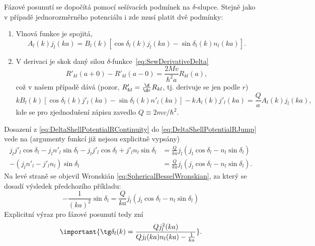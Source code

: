 \begin{solution}
		Fázové posunutí se dopočítá pomocí sešívacích podmínek na $\delta$-slupce.
		Stejně jako v případě jednorozměrného potenciálu i zde musí platit dvě podmínky:
		\begin{enumerate}
			\item
				Vlnová funkce je spojitá,
				\begin{equation}\label{eq:DeltaShellPotentialRContinuity}
					A_{l}(k)j_{l}(ka)
						=B_{l}(k)\left[\cos{\delta_{l}(k)}j_{l}(ka)-\sin{\delta_{l}(k)}n_{l}(ka)\right].
				\end{equation}
					
			\item
				V derivaci je skok daný silou $\delta$-funkce~\eqref{eq:SewDerivativeDelta}
				\begin{equation}
					R'_{kl}(a+0)-R'_{kl}(a-0)
						=\frac{2Mv}{\hbar^{2}a}R_{kl}(a),
				\end{equation}
				což v našem případě dává (pozor, $R'_{kl}=\frac{\d}{\d r}R_{kl}$, tj. derivuje se jen podle $r$)
				\begin{equation}\label{eq:DeltaShellPotentialRJump}
					kB_{l}(k)\left[\cos{\delta_{l}(k)}j'_{l}(ka)-\sin{\delta_{l}(k)}n'_{l}(ka)\right]
						-kA_{l}(k)j'_{l}(ka)
						=\frac{Q}{a}A_{l}(k)j_{l}(ka),
				\end{equation}
				kde se pro zjednodušení zápisu zavedlo $Q\equiv2mv/\hbar^{2}$.
		\end{enumerate}
		
		Dosazení z \eqref{eq:DeltaShellPotentialRContinuity} do \eqref{eq:DeltaShellPotentialRJump} vede na (argumenty funkcí již nejsou explicitně vypsány)
		\begin{align}
			j_{l}j'_{l}\cos{\delta_{l}}-j_{l}n'_{l}\sin{\delta_{l}}
				-j_{l}j'_{l}\cos{\delta_{l}}+j'_{l}n_{l}\sin{\delta_{l}}
				&=\frac{Q}{ka}j_{l}\left(j_{l}\cos{\delta_{l}}-n_{l}\sin{\delta_{l}}\right)\nonumber\\
			-\left(j_{l}n'_{l}-j'_{l}n_{l}\right)\sin{\delta_{l}}
				&=\frac{Q}{ka}j_{l}\left(j_{l}\cos{\delta_{l}}-n_{l}\sin{\delta_{l}}\right).
		\end{align}
		Na levé straně se objevil Wronskián \eqref{eq:SphericalBesselWronskian}, za který se dosadí výsledek předchozího příkladu:
		\begin{equation}
			-\frac{1}{(ka)^{2}}\sin{\delta_{l}}
				=\frac{Q}{ka}j_{l}\left(j_{l}\cos{\delta_{l}}-n_{l}\sin{\delta_{l}}\right)
		\end{equation}
		Explicitní výraz pro fázové posunutí tedy zní
		\begin{equation}\label{eq:DeltaShellPotentialPhaseShift}
			\important{
				\tg\delta_{l}(k)
					=\frac{Qj_{l}^{2}(ka)}{Qj_{l}(ka)n_{l}(ka)-\frac{1}{ka}}
            }.
		\end{equation}


\end{solution}
